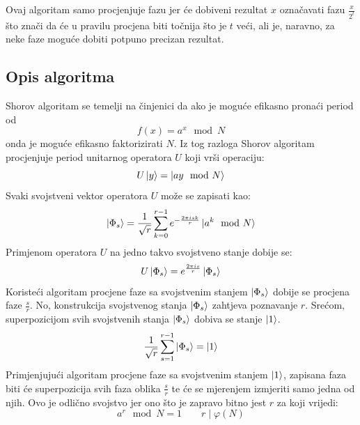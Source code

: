 Ovaj algoritam samo procjenjuje fazu jer će dobiveni rezultat $x$ označavati fazu $\frac{x}{2^t}$ što znači da će u pravilu procjena biti točnija što je $t$ veći, ali je, naravno, za neke faze moguće dobiti potpuno precizan rezultat.

\subsection{Opis algoritma}

Shorov algoritam se temelji na činjenici da ako je moguće efikasno pronaći period od
\begin{equation}
f(x) = a^x \mod N
\end{equation}
onda je moguće efikasno faktorizirati $N$. Iz tog razloga Shorov algoritam procjenjuje period unitarnog operatora $U$ koji vrši operaciju:
\begin{equation}
U\ket{y} = \ket{ay\mod N}
\end{equation}
Svaki svojstveni vektor operatora $U$ može se zapisati kao:
\begin{equation}
\ket{\Phi_s} = \frac{1}{\sqrt{r}}\sum_{k=0}^{r-1}e^{-\frac{2\pi i s k}{r}}\ket{a^k\mod N}
\end{equation}
Primjenom operatora $U$ na jedno takvo svojstveno stanje dobije se:
\begin{equation}
U\ket{\Phi_s} = e^{\frac{2\pi i s}{r}}\ket{\Phi_s}
\end{equation}
Koristeći algoritam procjene faze sa svojstvenim stanjem $\ket{\Phi_s}$ dobije se procjena faze $\frac{s}{r}$. No, konstrukcija svojstvenog stanja $\ket{\Phi_s}$ zahtjeva poznavanje $r$. Srećom, superpozicijom svih svojstvenih stanja $\ket{\Phi_s}$ dobiva se stanje $\ket{1}$.
\begin{equation}
\frac{1}{\sqrt{r}}\sum_{s=1}^{r-1}\ket{\Phi_s} = \ket{1}
\end{equation}
Primjenjujući algoritam procjene faze sa svojstvenim stanjem $\ket{1}$, zapisana faza biti će superpozicija svih faza oblika $\frac{s}{r}$ te će se mjerenjem izmjeriti samo jedna od njih. Ovo je odlično svojstvo jer ono što je zapravo bitno jest $r$ za koji vrijedi:
\begin{equation}
a^r \mod N = 1 \qquad
r \mid \varphi(N)
\end{equation}

